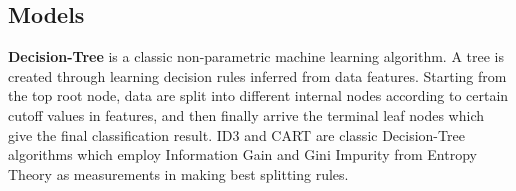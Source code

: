 \documentclass{article}
\begin{document}



\subsection{Models}
\par\noindent\textbf{Decision-Tree} is a classic non-parametric machine learning algorithm. A tree is created through learning decision rules inferred from data features. Starting from the top root node, data are split into different internal nodes according to certain cutoff values in features, and then finally arrive the terminal leaf nodes which give the final classification result. ID3 \cite{quinlan1986induction} and CART \cite{breiman1984classification} are classic Decision-Tree algorithms which employ Information Gain and Gini Impurity from Entropy Theory \cite{pal1991entropy} as measurements in making best splitting rules.
\end{document}
